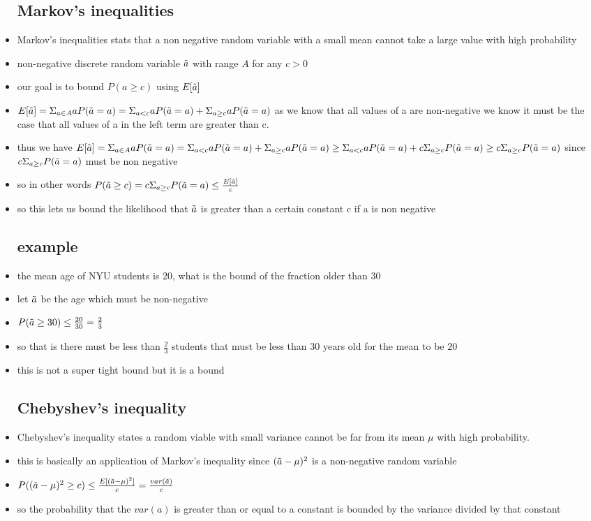 \documentclass{article}
\begin{document}
\begin{itemize}
\subsection{Markov's inequalities }
\item Markov's inequalities stats that a non negative random variable with a small mean cannot take  a large value with high probability
\item non-negative discrete random variable $\Tilde{a}$ with range $A$ for any $c>0$  
\item our goal is to bound $P(a\geq c)$ using $E[\Tilde{a}]$
\item $E[\Tilde{a}]=\Sigma_{a\in A}aP(\Tilde{a}=a)=\Sigma_{a<c}aP(\Tilde{a}=a)+\Sigma_{a\geq c}aP(\Tilde{a}=a)$ as we know that all values of a are non-negative we know it must be the case that all values of a in the left term are greater than c. 
\item thus we have  $E[\Tilde{a}]=\Sigma_{a\in A}aP(\Tilde{a}=a)=\Sigma_{a<c}aP(\Tilde{a}=a)+\Sigma_{a\geq c}aP(\Tilde{a}=a)\geq \Sigma_{a<c}aP(\Tilde{a}=a)+c\Sigma_{a\geq c}P(\Tilde{a}=a)\geq c\Sigma_{a\geq c}P(\Tilde{a}=a) $  since $c\Sigma_{a\geq c}P(\Tilde{a}=a)$ must be non negative
\item so in other words $P(\Tilde{a}\geq c)=c\Sigma_{a\geq c}P(\Tilde{a}=a)\leq\frac{E[\Tilde{a}]}{c}$ 
\item so this lets us bound the likelihood that $\Tilde{a}$ is greater than a certain constant c if a is non negative
\subsection{example}
\item the mean age of NYU students is 20, what is the bound of the fraction older than 30
\item let $\Tilde{a}$ be the age which must be non-negative 
\item $P(\Tilde{a}\geq 30)\leq \frac{20}{30}=\frac{2}{3}$
\item so that is there must be less than $\frac{2}{3}$ students that must be less than 30 years old for the mean to be $20$
\item this is not a super tight bound but it is a bound 
\subsection{Chebyshev's inequality}
\item Chebyshev's inequality states a random viable with small variance cannot be far from its mean $\mu$ with high probability. 
\item this is basically an application of Markov's inequality since $(\Tilde{a}-\mu)^2$ is a non-negative random variable
\item $P((\Tilde{a}-\mu)^2\geq c)\leq \frac{E[(\Tilde{a}-\mu)^2]}{c}=\frac{var(\Tilde{a})}{c}$
\item so the probability that the $var(a)$ is greater than or equal to a constant is bounded by the variance divided by that constant

\end{itemize}
\end{document}
